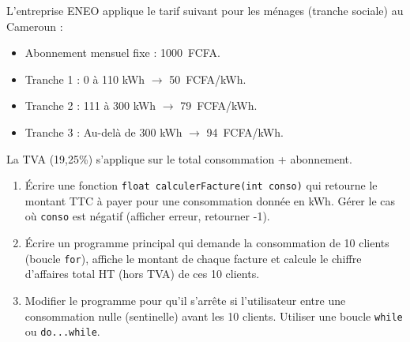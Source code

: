 \documentclass[11pt]{article}
\begin{document}
\begin{exercice}
L'entreprise ENEO applique le tarif suivant pour les ménages (tranche sociale) au Cameroun :
\begin{itemize}
    \item Abonnement mensuel fixe : \SI{1000}{FCFA}.
    \item Tranche 1 : 0 à 110 kWh $\rightarrow$ \SI{50}{FCFA/kWh}.
    \item Tranche 2 : 111 à 300 kWh $\rightarrow$ \SI{79}{FCFA/kWh}.
    \item Tranche 3 : Au-delà de 300 kWh $\rightarrow$ \SI{94}{FCFA/kWh}.
\end{itemize}
La TVA (19,25\%) s'applique sur le total consommation + abonnement.

\begin{enumerate}
    \item Écrire une fonction \texttt{float calculerFacture(int conso)} qui retourne le montant TTC à payer pour une consommation donnée en kWh. Gérer le cas où \texttt{conso} est négatif (afficher erreur, retourner -1).
    \item Écrire un programme principal qui demande la consommation de 10 clients (boucle \texttt{for}), affiche le montant de chaque facture et calcule le chiffre d'affaires total HT (hors TVA) de ces 10 clients.
    \item Modifier le programme pour qu'il s'arrête si l'utilisateur entre une consommation nulle (sentinelle) avant les 10 clients. Utiliser une boucle \texttt{while} ou \texttt{do...while}.
\end{enumerate}
\end{exercice}
\end{document}
